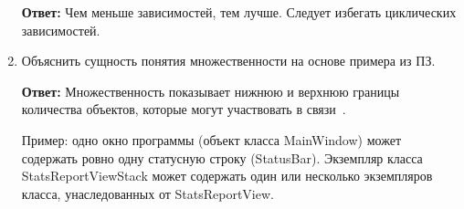 \begin{enumerate}[label=\arabic*)]
  \textbf{Ответ:}
  Чем меньше зависимостей, тем лучше.
  Следует избегать циклических зависимостей.

\item Объяснить сущность понятия множественности на основе примера из ПЗ.

  \textbf{Ответ:} 
  Множественность показывает нижнюю и верхнюю границы количества объектов,
  которые могут участвовать в связи~\cite{itteach_class_diagrams}.

  Пример: одно окно программы (объект класса MainWindow) может содержать
  ровно одну статусную строку (StatusBar).
  Экземпляр класса StatsReportViewStack может содержать один или несколько
  экземпляров класса, унаследованных от StatsReportView.

\end{enumerate}